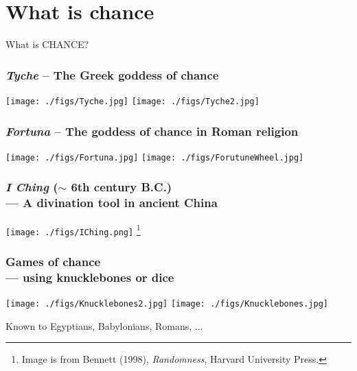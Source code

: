 \documentclass[9pt,xcolor=dvipsnames,table]{beamer}
\begin{document}
\begin{frame}[noframenumbering] \titlepage
\end{frame}
\begin{frame} \tableofcontents\end{frame}
\section{What is chance}%
\begin{frame}[fragile] %
\begin{center}
  \huge
  What is CHANCE?
\end{center}
\end{frame}
\begin{frame}[fragile,t] %
  \frametitle{{\it Tyche} -- The Greek goddess of chance}
  \begin{center}
    \texttt{[image: ./figs/Tyche.jpg]} \quad
    \texttt{[image: ./figs/Tyche2.jpg]}
  \end{center}
\end{frame}
\begin{frame}[fragile] %
  \frametitle{{\it Fortuna} -- The goddess of chance in Roman religion}
  \begin{center}
    \texttt{[image: ./figs/Fortuna.jpg]} \quad
    \texttt{[image: ./figs/ForutuneWheel.jpg]}
  \end{center}
\end{frame}
\begin{frame}[fragile] %
  \frametitle{{\it I Ching} ($\sim$ 6th century B.C.)\\
  --- A divination tool in ancient China}
 \begin{center}
   \texttt{[image: ./figs/IChing.png]}
   \footnote{Image is from Bennett (1998), {\it Randomness}, Harvard University Press.}
 \end{center}
\end{frame}
\begin{frame}[fragile] %
  \frametitle{Games of chance \\ --- using knucklebones or dice}
  \begin{center}
    \texttt{[image: ./figs/Knucklebones2.jpg]} \quad
    \texttt{[image: ./figs/Knucklebones.jpg]}
    \bigskip

    Known to Egyptians, Babylonians, Romans, ...
  \end{center}
\end{frame}
\end{document}
